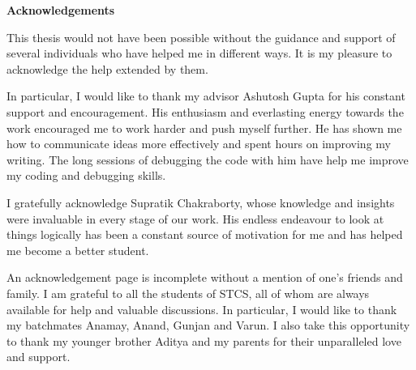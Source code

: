 
\centerline{\bfseries Acknowledgements}
\vspace{0.3 cm}

\noindent This thesis would not have been possible without the guidance and support of several individuals who have helped me in different ways. It is my pleasure to acknowledge the help extended by them.
\vspace{0.3 cm}

In particular, I would like to thank my advisor Ashutosh Gupta for his constant support and encouragement. His enthusiasm and everlasting energy towards the work encouraged me to work harder and push myself further. He has shown me how to communicate ideas more
effectively and spent hours on improving my writing. The long sessions of debugging the code with him have help me improve my coding and debugging skills. 
\vspace{0.3 cm}

I gratefully acknowledge Supratik Chakraborty, whose knowledge and insights were invaluable in every stage of our work. His endless endeavour to look at things logically has been a constant source of motivation for me and has helped me become a better student.

\vspace{0.3 cm}

An acknowledgement page is incomplete without a mention of one's friends and family. I am grateful to all the students of STCS, all of whom are always available for help and valuable discussions. In particular, I would like to thank my batchmates Anamay, Anand, Gunjan and Varun. I also take this opportunity to thank my younger brother Aditya and my parents for their unparalleled love and support.